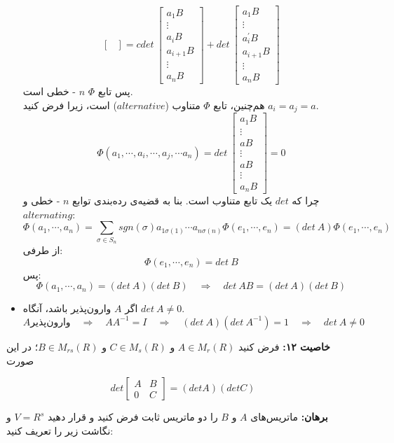 \begin{itemize}
$$\begin{bmatrix}
	\end{bmatrix} = cdet\: \begin{bmatrix}
	a_1B \\ \vdots \\ a_iB \\ a_{i+1}B\\ \vdots \\ a_nB
	\end{bmatrix}+ det\: \begin{bmatrix}
	a_1B \\ \vdots \\ a_i^\prime B \\ a_{i+1}B\\ \vdots \\ a_nB
	\end{bmatrix}$$
	پس تابع $\Phi$ $n$ - خطی است.\\
	هم‌چنین، تابع $\Phi$ متناوب ($alternative$) است، زیرا فرض کنید $a_i = a_j = a$.
	$$\Phi(a_1, \cdots, a_i, \cdots, a_j, \cdots a_n) = det\: \begin{bmatrix}
	a_1B \\ \vdots \\ aB \\ \vdots \\ aB\\ \vdots \\ a_nB
	\end{bmatrix} = 0$$
	چرا که $det$ یک تابع متناوب است. بنا به قضیه‌ی رده‌بندی توابع $n$ - خطی و $alternating$:
	$$\Phi (a_1,\cdots,a_n) = \sum_{\sigma\in S_n} sgn(\sigma) a_{1\sigma(1)} \cdots a_{n\sigma(n)}\Phi (e_1,\cdots,e_n)= (det\: A) \Phi (e_1,\cdots, e_n)$$
	از طرفی:
	$$\Phi(e_1,\cdots, e_n) = det\: B$$
	پس:
	$$\Phi ( a_1,\cdots,a_n) = (det\:A)(det\:B) \quad \Rightarrow \quad det\: AB = (det\:A)(det\:B)$$
	\item اگر $A$ وارون‌پذیر باشد، آنگاه $det\: A\neq 0$.
	$$A \text{وارون‌پذیر}\quad \Rightarrow\quad AA^{-1}= I \quad\Rightarrow\quad (det\:A)(det\:A^{-1}) = 1\quad\Rightarrow\quad det\:A \neq 0$$
	
\end{itemize}
\textbf{خاصیت ۱۲:}
فرض کنید $A\in M_r(R)$ و $C\in M_s(R)$ و $B\in M_{rs}(R)$؛ در این صورت

$$ det \begin{bmatrix}
A & B \\
0 & C
\end{bmatrix} = (detA)(detC) $$

\textbf{برهان:}
ماتریس‌های $A$ و $B$ را دو ماتریس ثابت فرض کنید و قرار دهید $V=R^s$ و نگاشت زیر را تعریف کنید:

